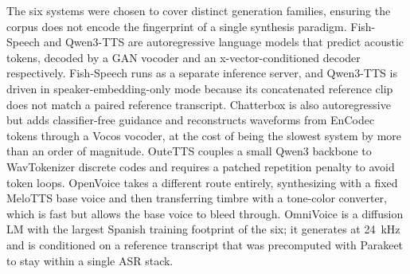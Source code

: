 \documentclass[11pt]{report}
\begin{document}
The six systems were chosen to cover distinct generation families,
ensuring the corpus does not encode the fingerprint of a single
synthesis paradigm. Fish-Speech and Qwen3-TTS are autoregressive language
models that predict acoustic tokens, decoded by a GAN vocoder and an
x-vector-conditioned decoder respectively. Fish-Speech runs as a separate
inference server, and Qwen3-TTS is driven in speaker-embedding-only mode
because its concatenated reference clip does not match a paired
reference transcript. Chatterbox is also autoregressive but adds
classifier-free guidance and reconstructs waveforms from EnCodec tokens
through a Vocos vocoder, at the cost of being the slowest system by more
than an order of magnitude. OuteTTS couples a small Qwen3 backbone to
WavTokenizer discrete codes and requires a patched repetition penalty to
avoid token loops. OpenVoice takes a different route entirely,
synthesizing with a fixed MeloTTS base voice and then transferring timbre
with a tone-color converter, which is fast but allows the base voice to
bleed through. OmniVoice is a diffusion LM with the largest Spanish
training footprint of the six; it generates at \SI{24}{\kilo\hertz} and
is conditioned on a reference transcript that was precomputed with
Parakeet to stay within a single ASR stack.
\end{document}
